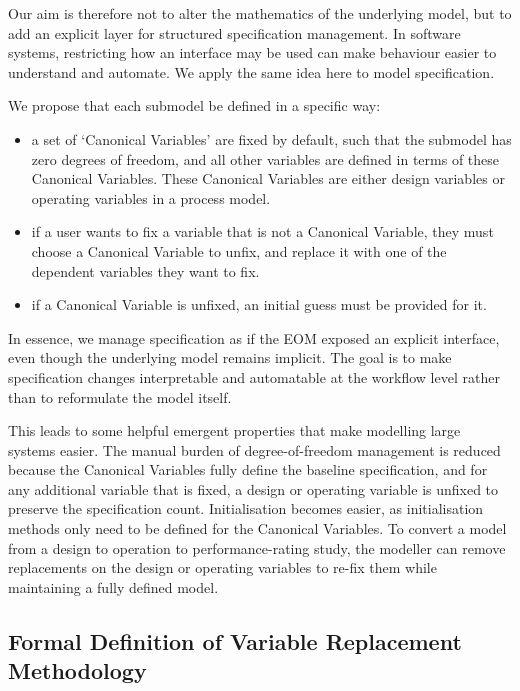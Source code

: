Our aim is therefore not to alter the mathematics of the underlying
model, but to add an explicit layer for structured specification
management. In software systems, restricting how an interface may be
used can make behaviour easier to understand and automate. We apply the
same idea here to model specification.

We propose that each submodel be defined in a specific way:

\begin{itemize}
  \item a set of `Canonical Variables' are fixed by default, such that the submodel has zero degrees of freedom, and all other variables are defined in terms of these Canonical Variables. These Canonical Variables are either design variables or operating variables in a process model.
  \item if a user wants to fix a variable that is not a Canonical Variable, they must choose a Canonical Variable to unfix, and replace it with one of the dependent variables they want to fix.
  \item if a Canonical Variable is unfixed, an initial guess must be provided for it.
\end{itemize}

In essence, we manage specification as if the EOM exposed an explicit
interface, even though the underlying model remains implicit. The goal
is to make specification changes interpretable and automatable at the
workflow level rather than to reformulate the model itself.

This leads to some helpful emergent properties that make modelling
large systems easier. The manual burden of degree-of-freedom management
is reduced because the Canonical Variables fully define the baseline
specification, and for any additional variable that is fixed, a design
or operating variable is unfixed to preserve the specification count.
Initialisation becomes easier, as initialisation methods only need to be
defined for the Canonical Variables. To convert a model from a design to
operation to performance-rating study, the modeller can remove
replacements on the design or operating variables to re-fix them while
maintaining a fully defined model.

\hypertarget{formal-definition-of-variable-replacement-methodology}{%
\subsection{Formal Definition of Variable Replacement
Methodology}\label{formal-definition-of-variable-replacement-methodology}}

